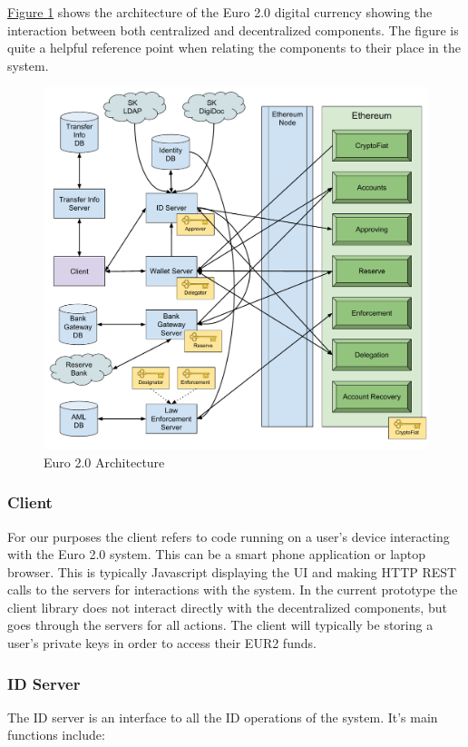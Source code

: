 \documentclass[a4paper,12pt]{article} %
\newcommand{\hyperfigureref}[1]{\hyperref[#1]{Figure \ref{#1}}}
\begin{document}
{\hyperfigureref{fig:euro2architecture} shows the architecture of the Euro 2.0 digital currency showing the interaction between both centralized and decentralized components. The figure is quite a helpful reference point when relating the components to their place in the system.

\begin{figure}[ht]
    \centering
    \includegraphics[width=\textwidth]{euro2-architecture}
    \caption{Euro 2.0 Architecture}
    \label{fig:euro2architecture}
\end{figure}

\subsubsection{Client} \label{sssec:3.5:client}
For our purposes the client refers to code running on a user's device interacting with the Euro 2.0 system. This can be a smart phone application or laptop browser. This is typically Javascript displaying the UI and making HTTP REST calls to the servers for interactions with the system. In the current prototype the client library does not interact directly with the decentralized components, but goes through the servers for all actions. The client will typically be storing a user's private keys in order to access their EUR2 funds.

\subsubsection{ID Server} \label{sssec:3.5:idServer}
The ID server is an interface to all the ID operations of the system. It's main functions include:

}
\end{document}
